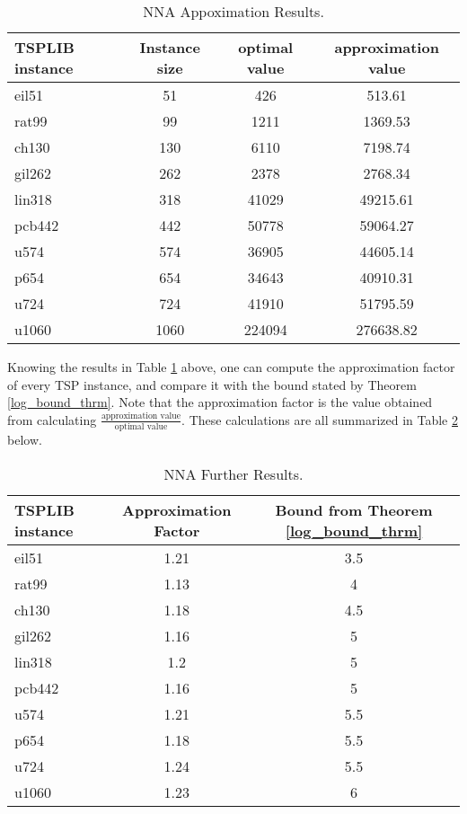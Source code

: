 \documentclass{article}
\begin{document}
\begin{table}[H]
    \caption{NNA Appoximation Results.}
    \label{tab:NNA_results}
    \begin{tabular}{l|c|c|c} %
      \textbf{TSPLIB instance} & \textbf{Instance size} & \textbf{optimal value} & \textbf{approximation value}\\
      \hline
    eil51 & 51 & 426 & 513.61\\
    rat99 & 99 & 1211 &  1369.53\\
    ch130 & 130 & 6110 & 7198.74 \\
    gil262 & 262 & 2378 & 2768.34\\
    lin318 & 318 & 41029 & 49215.61\\
    pcb442 & 442 & 50778 & 59064.27\\
    u574 & 574  & 36905 & 44605.14 \\ 
    p654 & 654 & 34643 & 40910.31\\
    u724 & 724 & 41910 & 51795.59\\
    u1060 & 1060 & 224094 & 276638.82\\
    \end{tabular}
\end{table}
Knowing the results in Table \ref{tab:NNA_results} above, one can compute the approximation factor of every TSP instance, and compare it with the bound stated by Theorem \ref{log_bound_thrm}. Note that the approximation factor is the value obtained from calculating $\frac{\text{approximation value}}{\text{optimal value}}$. These calculations are all summarized in Table \ref{tab:NNA_further_results} below. 
\begin{table}[H]
    \caption{NNA Further Results.}
    \label{tab:NNA_further_results}
    \begin{tabular}{l|c|c} %
      \textbf{TSPLIB instance} & \textbf{Approximation Factor} & \textbf{Bound from Theorem \ref{log_bound_thrm}}\\
      \hline
    eil51 & 1.21 & 3.5\\
    rat99 & 1.13 & 4 \\
    ch130 & 1.18  & 4.5  \\
    gil262 &1.16 &  5  \\
    lin318 & 1.2 &  5  \\
    pcb442 & 1.16  & 5  \\
    u574 & 1.21   & 5.5  \\ 
    p654 & 1.18  & 5.5 \\
    u724 & 1.24 & 5.5 \\
    u1060 & 1.23  & 6  \\
    \end{tabular}
\end{table}
\end{document}

